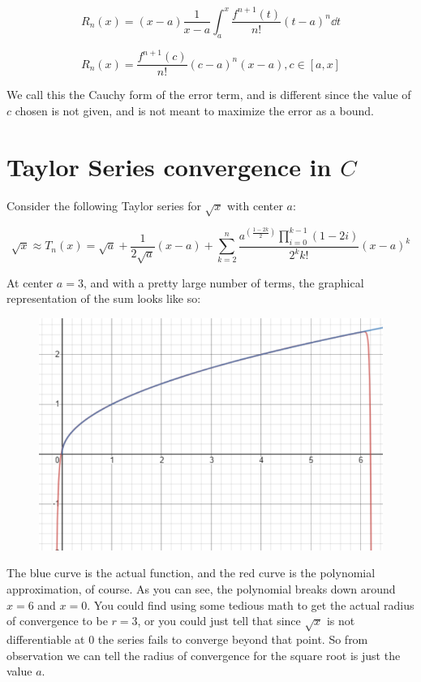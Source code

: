 \documentclass[11pt]{article}
\begin{document}
$$R_n(x) = {(x-a)}\frac{1}{x-a}\int_a^x \frac{f^{n+1}(t)}{n!}(t-a)^{n}\dd{t}$$

$$R_n(x) = \frac{f^{n+1}(c)}{n!}(c-a)^n(x-a), {c\in[a,x]}$$

We call this the Cauchy form of the error term, and is different since the value of $c$ chosen is not given, and is not meant to maximize the error as a bound.

\newpage

\section{Taylor Series convergence in ${C}$}

Consider the following Taylor series for $\sqrt{x}$ with center $a$:

$$\sqrt{x} \approx T_n(x) = \sqrt{a}+\frac{1}{2\sqrt{a}}\left(x-a\right)+\sum_{k=2}^{n}\frac{\displaystyle{a^{\left(\frac{1-2k}{2}\right)}\prod_{i=0}^{k-1}\left(1-2i\right)}}{\displaystyle{2^{k}k!}}\left(x-a\right)^{k}$$

At center $a=3$, and with a pretty large number of terms, the graphical representation of the sum looks like so:

\begin{figure}[h]
\centering
\includegraphics[scale=1]{sqrt}
\end{figure}

The blue curve is the actual function, and the red curve is the polynomial approximation, of course. As you can see, the polynomial breaks down around $x=6$ and $x=0$. You could find using some tedious math to get the actual radius of convergence to be $r=3$, or you could just tell that since $\sqrt{x}$ is not differentiable at $0$ the series fails to converge beyond that point. So from observation we can tell the radius of convergence for the square root is just the value $a$.
\end{document}
